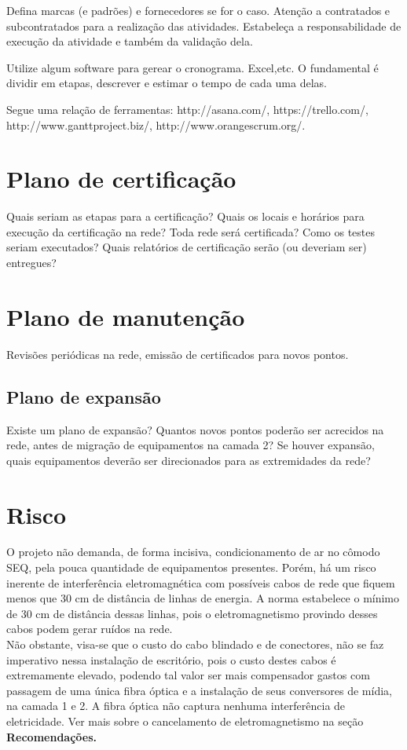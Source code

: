 \documentclass[	DIV=calc,%
							paper=a4,%
							fontsize=12pt,%
							onecolumn]{scrartcl}	 					%
\begin{document}
Defina marcas (e padrões) e fornecedores se for o caso. Atenção a contratados e subcontratados para a realização das atividades. Estabeleça a responsabilidade de execução da atividade e também da validação dela.

Utilize algum software para gerear o cronograma. Excel,etc. O fundamental é dividir em etapas, descrever e estimar o tempo de cada uma delas.

Segue uma relação de ferramentas:
http://asana.com/, 
https://trello.com/, 
http://www.ganttproject.biz/, 
http://www.orangescrum.org/. 

\section{Plano de certificação}
Quais seriam as etapas para a certificação? 
Quais os locais e horários para execução da certificação na rede? Toda rede será certificada?
Como os testes seriam executados?
Quais relatórios de certificação serão (ou deveriam ser) entregues? 

\section{Plano de manutenção}

Revisões periódicas na rede, emissão de certificados para novos pontos.

\subsection{Plano de expansão}
Existe um plano de expansão? Quantos novos pontos poderão ser acrecidos na rede, antes de migração de equipamentos na camada 2? Se houver expansão, quais equipamentos deverão ser direcionados para as extremidades da rede? 

\section{Risco}
O projeto não demanda, de forma incisiva, condicionamento de ar no cômodo SEQ, pela pouca quantidade de equipamentos presentes. Porém, há um risco inerente de interferência eletromagnética com possíveis cabos de rede que fiquem menos que 30 cm de distância de linhas de energia. A norma estabelece o mínimo de 30 cm de distância dessas linhas, pois o eletromagnetismo provindo desses cabos podem gerar ruídos na rede.
\\

Não obstante, visa-se que o custo do cabo blindado e de conectores, não se faz imperativo nessa instalação de escritório, pois o custo destes cabos é extremamente elevado, podendo tal valor ser mais compensador gastos com passagem de uma única fibra óptica e a instalação de seus conversores de mídia, na camada 1 e 2. A fibra óptica não captura nenhuma interferência de eletricidade. Ver mais sobre o cancelamento de eletromagnetismo na seção \textbf{Recomendações.}
\\
\end{document}
